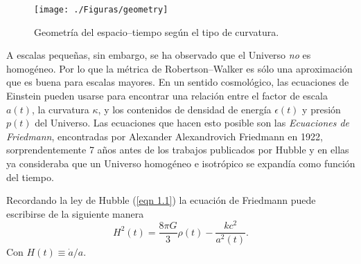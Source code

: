 \documentclass[a4paper,openright,12pt]{book}
\begin{document}
\begin{figure}
\centering
\texttt{[image: ./Figuras/geometry]}
\caption{Geometría del espacio--tiempo según el tipo de curvatura.}
\end{figure}

A escalas pequeñas, sin embargo, se ha observado que el Universo \textit{no} es homogéneo. Por lo que la métrica de Robertson--Walker es sólo una aproximación que es buena para escalas mayores. En un sentido cosmológico, las ecuaciones de Einstein pueden usarse para encontrar una relación entre el factor de escala $a(t)$, la curvatura $\kappa$, y los contenidos de densidad de energía $\epsilon(t)$ y presión $p(t)$ del Universo. Las ecuaciones que hacen esto posible son las \textit{Ecuaciones de Friedmann}, encontradas por Alexander Alexandrovich Friedmann en 1922, sorprendentemente 7 años antes de los trabajos publicados por Hubble y en ellas ya consideraba que un Universo homogéneo e isotrópico se expandía como función del tiempo. 

Recordando la ley de Hubble (\ref{eqn 1.1}) la ecuación de Friedmann puede escribirse de la siguiente manera
\begin{equation}
H^{2}(t) = \frac{8 \pi G}{3}\rho(t) 
-\frac{k c^{2}}{a^{2}(t)}.\label{eqn 1.19}
\end{equation}
Con $H(t) \equiv \dot{a}/a$.
\end{document}
